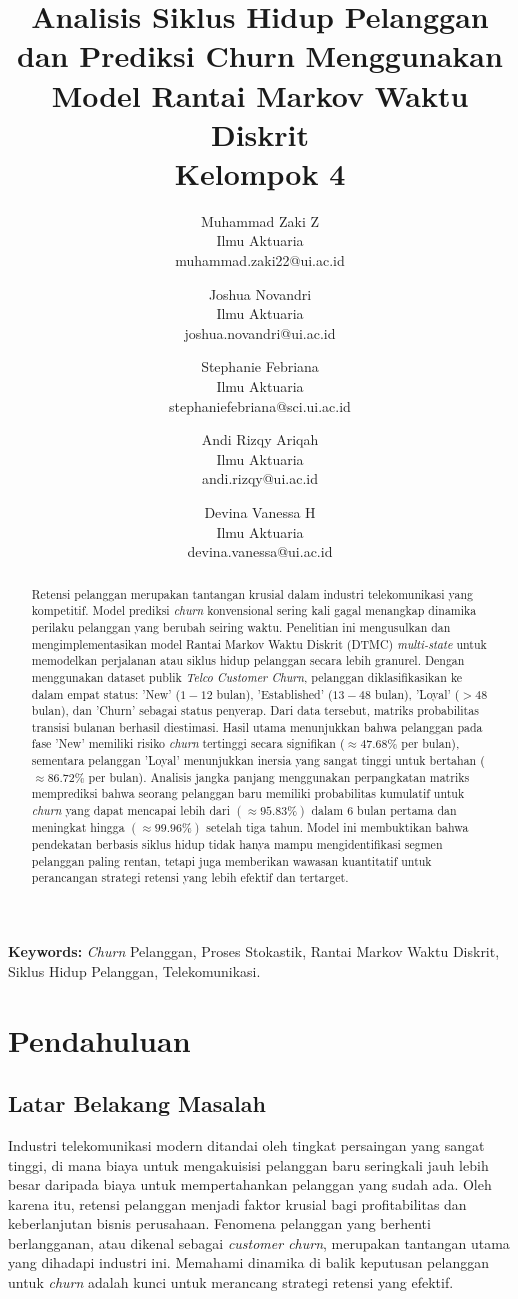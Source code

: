 \documentclass[a4paper,12pt]{article}
\title{
\bf Analisis Siklus Hidup Pelanggan dan Prediksi Churn Menggunakan Model Rantai Markov Waktu Diskrit \\
\vspace{0.5em}
\large Kelompok 4
}
\author{
Muhammad Zaki Z \\
\small Ilmu Aktuaria \\
\small muhammad.zaki22@ui.ac.id
\and
Joshua Novandri \\
\small Ilmu Aktuaria \\
\small joshua.novandri@ui.ac.id
\and
Stephanie Febriana \\
\small Ilmu Aktuaria \\
\small stephaniefebriana@sci.ui.ac.id
\and
Andi Rizqy Ariqah \\
\small Ilmu Aktuaria \\
\small andi.rizqy@ui.ac.id
\and
Devina Vanessa H \\
\small Ilmu Aktuaria \\
\small devina.vanessa@ui.ac.id
}
\date{}
\begin{document}
\maketitle

\begin{abstract}
Retensi pelanggan merupakan tantangan krusial dalam industri telekomunikasi yang kompetitif. Model prediksi \textit{churn} konvensional sering kali gagal menangkap dinamika perilaku pelanggan yang berubah seiring waktu. Penelitian ini mengusulkan dan mengimplementasikan model Rantai Markov Waktu Diskrit (DTMC) \textit{multi-state} untuk memodelkan perjalanan atau siklus hidup pelanggan secara lebih granurel. Dengan menggunakan dataset publik \textit{Telco Customer Churn}, pelanggan diklasifikasikan ke dalam empat status: 'New' ($1-12$ bulan), 'Established' ($13-48$ bulan), 'Loyal' ($>48$ bulan), dan 'Churn' sebagai status penyerap. Dari data tersebut, matriks probabilitas transisi bulanan berhasil diestimasi. Hasil utama menunjukkan bahwa pelanggan pada fase 'New' memiliki risiko \textit{churn} tertinggi secara signifikan ($\approx 47.68\%$ per bulan), sementara pelanggan 'Loyal' menunjukkan inersia yang sangat tinggi untuk bertahan ($\approx86.72\%$ per bulan). Analisis jangka panjang menggunakan perpangkatan matriks memprediksi bahwa seorang pelanggan baru memiliki probabilitas kumulatif untuk \textit{churn} yang dapat mencapai lebih dari $(\approx95.83\%)$ dalam 6 bulan pertama dan meningkat hingga $(\approx99.96\%)$ setelah tiga tahun. Model ini membuktikan bahwa pendekatan berbasis siklus hidup tidak hanya mampu mengidentifikasi segmen pelanggan paling rentan, tetapi juga memberikan wawasan kuantitatif untuk perancangan strategi retensi yang lebih efektif dan tertarget.
\end{abstract}


\noindent\textbf{Keywords:} \textit{Churn} Pelanggan, Proses Stokastik, Rantai Markov Waktu Diskrit, Siklus Hidup Pelanggan, Telekomunikasi.


\section{Pendahuluan}

\subsection{Latar Belakang Masalah}
Industri telekomunikasi modern ditandai oleh tingkat persaingan yang sangat tinggi, di mana biaya untuk mengakuisisi pelanggan baru seringkali jauh lebih besar daripada biaya untuk mempertahankan pelanggan yang sudah ada. Oleh karena itu, retensi pelanggan menjadi faktor krusial bagi profitabilitas dan keberlanjutan bisnis perusahaan. Fenomena pelanggan yang berhenti berlangganan, atau dikenal sebagai \textit{customer churn}, merupakan tantangan utama yang dihadapi industri ini. Memahami dinamika di balik keputusan pelanggan untuk \textit{churn} adalah kunci untuk merancang strategi retensi yang efektif.
\end{document}
